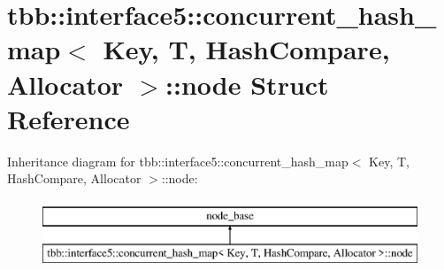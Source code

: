 \hypertarget{structtbb_1_1interface5_1_1concurrent__hash__map_1_1node}{}\section{tbb\+:\+:interface5\+:\+:concurrent\+\_\+hash\+\_\+map$<$ Key, T, Hash\+Compare, Allocator $>$\+:\+:node Struct Reference}
\label{structtbb_1_1interface5_1_1concurrent__hash__map_1_1node}
Inheritance diagram for tbb\+:\+:interface5\+:\+:concurrent\+\_\+hash\+\_\+map$<$ Key, T, Hash\+Compare, Allocator $>$\+:\+:node\+:\begin{figure}[H]
\begin{center}
\leavevmode
\includegraphics[height=2.000000cm]{structtbb_1_1interface5_1_1concurrent__hash__map_1_1node}
\end{center}
\end{figure}
